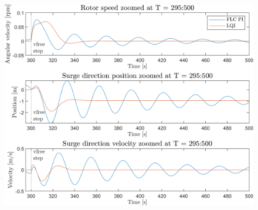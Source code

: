 \begin{figure}[ht]
	\centering
	\includegraphics[width=0.7\linewidth]{Graphics/TestResults/linearModPerf/03_W_py_vy_comp_zoom.png}
	\caption{}
	\label{fig:03_W_py_vy_comp_zoom}
\end{figure}